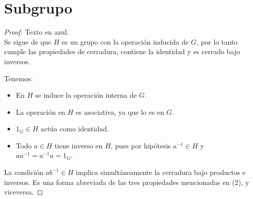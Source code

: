 
\section{Subgrupo}
\begin{definicion}
\end{definicion}



\begin{proposicion}\label{propsubgrupo}
\end{proposicion}

\begin{proof}
	{\color{white} Texto en azul.}\\
	
	\noindent [\(1 \Rightarrow 2\)] Se sigue de que \( H \) es un grupo con la operación inducida de \( G \), por lo tanto cumple las propiedades de cerradura, contiene la identidad y es cerrado bajo inversos.
	
	\vspace{1ex}
	\noindent [\(2 \Rightarrow 1\)] Tenemos:
	\begin{itemize}
		\item En \( H \) se induce la operación interna de \( G \).
		\item La operación en \( H \) es asociativa, ya que lo es en \( G \).
		\item \( 1_G \in H \) actúa como identidad.
		\item Todo \( a \in H \) tiene inverso en \( H \), pues por hipótesis \( a^{-1} \in H \) y \( a a^{-1} = a^{-1} a = 1_G \).
	\end{itemize}
	
	\vspace{1ex}
	\noindent [\(2 \Leftrightarrow 3\)] La condición \( ab^{-1} \in H \) implica simultáneamente la cerradura bajo productos e inversos. Es una forma abreviada de las tres propiedades mencionadas en (2), y viceversa.
\end{proof}



